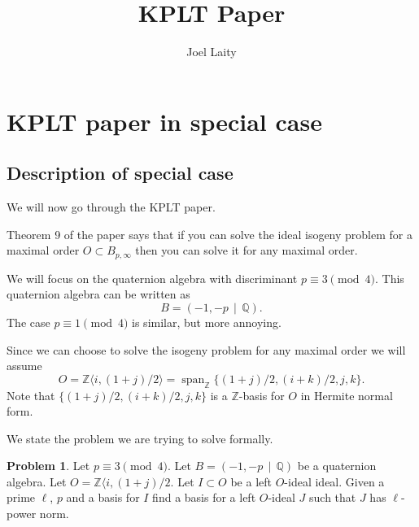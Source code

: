 \documentclass[10pt]{article}
\title{KPLT Paper}
\author{Joel Laity}
\theoremstyle{plain}
\theoremstyle{definition}
\newtheorem{problem}[theorem]{Problem}
\newcommand{\op}{\operatorname}
\newcommand{\Z}{\mathbb{Z}}
\newcommand{\Q}{\mathbb{Q}}
\begin{document}
\maketitle
\tableofcontents


\section{KPLT paper in special case}
\subsection{Description of special case}
We will now go through the KPLT paper.

Theorem 9 of the paper says that if you can solve the ideal isogeny problem for a maximal order \( O \subset B_{p, \infty} \) then you can solve it for any  maximal order.


We will focus on the quaternion algebra with discriminant \( p \equiv 3 \pmod{4} \).
This quaternion algebra can be written as
\[
    B = (-1, -p \, \mid \, \Q).
\]
The case \( p \equiv 1 \pmod{4} \) is similar, but more annoying.

Since we can choose to solve the isogeny problem for any maximal order we will assume
\[
    O = \Z \langle i, (1+j) / 2 \rangle = \op{span}_\Z \{ (1+j) / 2, (i+k) / 2 , j, k \}.
\]
Note that \( \{ (1+j) / 2, (i+k) / 2 , j, k \} \) is a \( \Z \)-basis for \( O \) in Hermite normal form.

We state the problem we are trying to solve formally.

\begin{problem} \label{prob: general}
Let \( p \equiv 3 \pmod{4} \).
Let \( B =  (-1, -p \, \mid \, \Q) \) be a quaternion algebra.
Let \( O = \Z \langle i, (1+j) / 2 \).
Let \( I \subset O \) be a left \( O \)-ideal ideal.
Given a prime \( \ell \), \( p \) and a basis for \( I \) find a basis for a left \( O \)-ideal \( J \) such that \( J \) has \( \ell \)-power norm.
\end{problem}
\end{document}
